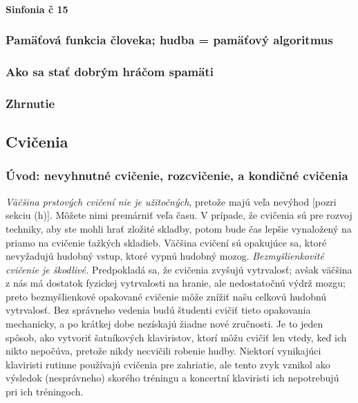 \paragraph{Sinfonia č 15}

\subsubsection{Pamäťová funkcia človeka; hudba = pamäťový algoritmus}

\subsubsection{Ako sa stať dobrým hráčom spamäti}

\subsubsection{Zhrnutie}

\subsection{Cvičenia}

\subsubsection{Úvod: nevyhnutné cvičenie, rozcvičenie, a kondičné cvičenia} 
\emph{Väčšina prstových cvičení nie je užitočných}, pretože majú veľa nevýhod [pozri sekciu (h)]. Môžete nimi premárniť veľa času. V prípade, že cvičenia sú pre rozvoj techniky, aby ste mohli hrať zložité skladby, potom bude čas lepšie vynaložený na priamo na cvičenie ťažkých skladieb. Väčšina cvičení sú opakujúce sa, ktoré nevyžadujú hudobný vstup, ktoré vypnú hudobný mozog. \emph{Bezmyšlienkovité cvičenie je škodlivé.} Predpokladá sa, že cvičenia zvyšujú vytrvalosť; avšak väčšina z nás má dostatok fyzickej vytrvalosti na hranie, ale nedostatočnú výdrž mozgu; preto bezmyšlienkové opakované cvičenie môže znížiť našu celkovú hudobnú vytrvalosť. Bez správneho vedenia budú študenti cvičiť tieto opakovania mechanicky, a po krátkej dobe nezískajú žiadne nové zručnosti. Je to jeden spôsob, ako vytvoriť šatníkových klaviristov, ktorí môžu cvičiť len vtedy, keď ich nikto nepočúva, pretože nikdy necvičili robenie hudby. Niektorí vynikajúci klaviristi rutinne používajú cvičenia pre zahriatie, ale tento zvyk vznikol ako výsledok (nesprávneho) skorého tréningu a koncertní klaviristi ich nepotrebujú pri ich tréningoch.

